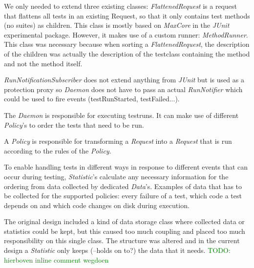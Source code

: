 \documentclass[i2]{oss}
\newcommand{\class}[1]{\emph{#1}}
\newcommand{\junit}{\emph{JUnit }}
\newcommand{\comment}[1]{{\huge \textcolor{green}{#1}}\\}
\begin{document}
We only needed to extend three existing classes: \class{FlattenedRequest}
is a request that flattens all tests in an existing Request, so that it only contains test methods (no suites) as children. 
This class is mostly based on \class{MaxCore} in the \junit experimental package. 
However, it makes use of a custom runner: \class{MethodRunner}. 
This class was necessary because when sorting a \class{FlattenedRequest}, the description of the children was actually the
description of the testclass containing the method and not the method 
itself.

\class{RunNotificationSubscriber} does not extend anything from 
\junit but is used as a protection proxy so \class{Daemon} does not have 
to pass an actual \class{RunNotifier} which could be used to fire events 
(testRunStarted, testFailed...). 

The \class{Daemon} is responsible for executing testruns.
It can make use of different \class{Policy}'s to order the tests that 
need to be run. 

A \class{Policy} is responsible for transforming a \class{Request} into a \class{Request} that is run according to the rules of the \class{Policy}. 

To enable handling tests in different ways in response to different 
events that can occur during testing, \class{Statistic}'s calculate any 
necessary information for the ordering from data collected by dedicated 
\class{Data}'s. %
Examples of data that has to be collected for the supported policies: 
every failure of a test, which code a test depends on and which code 
changes on disk during execution.

The original design included a kind of data storage class where collected
data or statistics could be kept, but this caused too much coupling
and placed too much responsibility on this single class.
The structure was altered and in the current design a \class{Statistic}
only keeps (--holds on to?) the data that it needs.
\comment{TODO: hierboven inline comment wegdoen}
\end{document}
